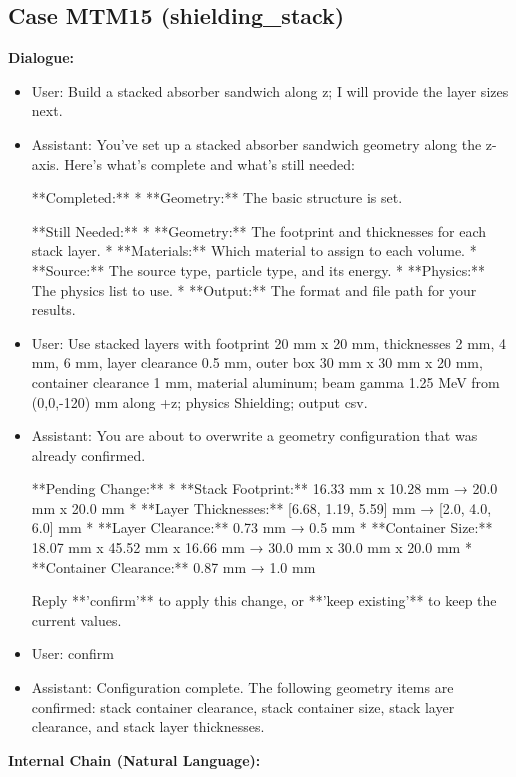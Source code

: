 \documentclass[11pt]{ctexart}
\begin{document}
\subsection{Case MTM15 (shielding\_stack)}
\textbf{Dialogue:}
\begin{itemize}
\item User: Build a stacked absorber sandwich along z; I will provide the layer sizes next.
\item Assistant: You've set up a stacked absorber sandwich geometry along the z-axis. Here's what's complete and what's still needed:

**Completed:**
*   **Geometry:** The basic structure is set.

**Still Needed:**
*   **Geometry:** The footprint and thicknesses for each stack layer.
*   **Materials:** Which material to assign to each volume.
*   **Source:** The source type, particle type, and its energy.
*   **Physics:** The physics list to use.
*   **Output:** The format and file path for your results.
\item User: Use stacked layers with footprint 20 mm x 20 mm, thicknesses 2 mm, 4 mm, 6 mm, layer clearance 0.5 mm, outer box 30 mm x 30 mm x 20 mm, container clearance 1 mm, material aluminum; beam gamma 1.25 MeV from (0,0,-120) mm along +z; physics Shielding; output csv.
\item Assistant: You are about to overwrite a geometry configuration that was already confirmed.

**Pending Change:**
*   **Stack Footprint:** 16.33 mm x 10.28 mm → 20.0 mm x 20.0 mm
*   **Layer Thicknesses:** [6.68, 1.19, 5.59] mm → [2.0, 4.0, 6.0] mm
*   **Layer Clearance:** 0.73 mm → 0.5 mm
*   **Container Size:** 18.07 mm x 45.52 mm x 16.66 mm → 30.0 mm x 30.0 mm x 20.0 mm
*   **Container Clearance:** 0.87 mm → 1.0 mm

Reply **'confirm'** to apply this change, or **'keep existing'** to keep the current values.
\item User: confirm
\item Assistant: Configuration complete. The following geometry items are confirmed: stack container clearance, stack container size, stack layer clearance, and stack layer thicknesses.
\end{itemize}
\textbf{Internal Chain (Natural Language):}
\end{document}
